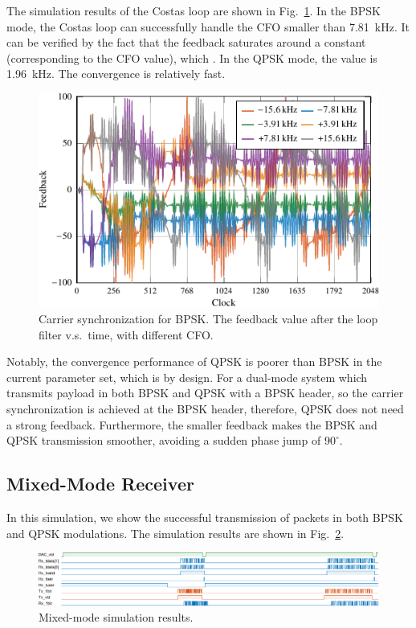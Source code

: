 \documentclass[journal,twoside]{IEEEtran}
\begin{document}
      The simulation results of the Costas loop are shown in Fig.~\ref{fig:sync_BPSK}.
      In the BPSK mode, the Costas loop can successfully handle the CFO smaller than \qty{7.81}{kHz}.
      It can be verified by the fact that the feedback saturates around a constant (corresponding to the CFO value),
      which .
      In the QPSK mode, the value is \qty{1.96}{kHz}.
      The convergence is relatively fast.
      \begin{figure}[htbp]
        \centering
        \includegraphics{_tikz_sim_sync_BPSK-crop.pdf}
        \caption{Carrier synchronization for BPSK. The feedback value after the loop filter v.s.\ time, with different CFO.}
        \label{fig:sync_BPSK}
      \end{figure}
      
      Notably, the convergence performance of QPSK is poorer than BPSK in the current parameter set,
      which is by design.
      For a dual-mode system which transmits payload in both BPSK and QPSK with a BPSK header,
      so the carrier synchronization is achieved at the BPSK header,
      therefore, QPSK does not need a strong feedback.
      Furthermore, the smaller feedback makes the BPSK and QPSK transmission smoother,
      avoiding a sudden phase jump of $90^\circ$.

    \subsection{Mixed-Mode Receiver}

      In this simulation, we show the successful transmission of packets in both BPSK and QPSK modulations.
      The simulation results are shown in Fig.~\ref{fig:mix_sim}.
      \begin{figure}
        \includegraphics{_tikz_sim_MIX-crop.pdf}
        \caption{Mixed-mode simulation results.}
        \label{fig:mix_sim}
      \end{figure}
\end{document}
